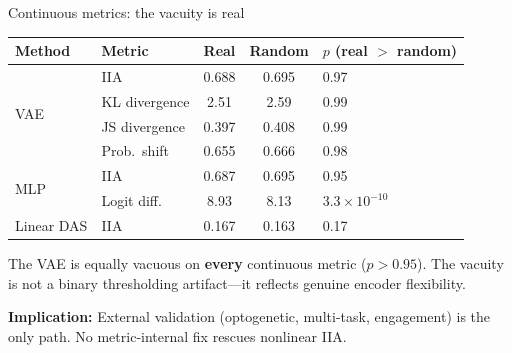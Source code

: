 \documentclass[aspectratio=169,11pt]{beamer}
\begin{document}
\begin{frame}{Continuous metrics: the vacuity is real}
\vspace{0.3em}

\begin{center}
{\scriptsize
\begin{tabular}{llccl}
\toprule
\textbf{Method} & \textbf{Metric} & \textbf{Real} & \textbf{Random} & \textbf{$p$ (real $>$ random)} \\
\midrule
\multirow{4}{*}{VAE} & IIA & 0.688 & 0.695 & 0.97 \\
 & KL divergence & 2.51 & 2.59 & 0.99 \\
 & JS divergence & 0.397 & 0.408 & 0.99 \\
 & Prob.\ shift & 0.655 & 0.666 & 0.98 \\
\midrule
\multirow{2}{*}{MLP} & IIA & 0.687 & 0.695 & 0.95 \\
 & Logit diff. & 8.93 & 8.13 & $3.3 \times 10^{-10}$ \\
\midrule
Linear DAS & IIA & 0.167 & 0.163 & 0.17 \\
\bottomrule
\end{tabular}
}
\end{center}

\vspace{0.5em}

\begin{flushleft}
The VAE is equally vacuous on \textbf{every} continuous metric ($p > 0.95$). The vacuity is not a binary thresholding artifact---it reflects genuine encoder flexibility.

\vspace{0.3em}
{\small \textbf{Implication:} External validation (optogenetic, multi-task, engagement) is the only path. No metric-internal fix rescues nonlinear IIA.}
\end{flushleft}
\end{frame}
\end{document}

